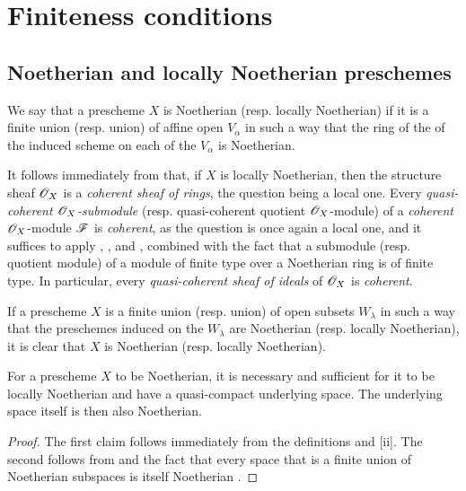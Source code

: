 \section{Finiteness conditions}
\label{section:I.6}

\subsection{Noetherian and locally Noetherian preschemes}
\label{subsection:I.6.1}

\begin{definition}[6.1.1]
\label{I.6.1.1}
We say that a prescheme $X$ is Noetherian (resp. locally Noetherian) if it is a finite union (resp. union) of affine open $V_\alpha$ in such a way that the ring of the of the induced scheme on each of the $V_\alpha$ is Noetherian.
\end{definition}

It follows immediately from  that, if $X$ is locally Noetherian, then the structure sheaf $\mathscr{O}_X$ is a \emph{coherent sheaf of rings}, the question being a local one.
Every \emph{quasi-coherent $\mathscr{O}_X$-submodule}
(resp. quasi-coherent quotient $\mathscr{O}_X$-module) of a \emph{coherent} $\mathscr{O}_X$-module $\mathscr{F}$ is \emph{coherent}, as the question is once again a local one, and it suffices to apply , , and , combined with the fact that a submodule (resp. quotient module) of a module of finite type over a Noetherian ring is of finite type.
In particular, every \emph{quasi-coherent sheaf of ideals} of $\mathscr{O}_X$ is \emph{coherent}.

If a prescheme $X$ is a finite union (resp. union) of open subsets $W_\lambda$ in such a way that the preschemes induced on the $W_\lambda$ are Noetherian (resp. locally Noetherian), it is clear that $X$ is Noetherian (resp. locally Noetherian).

\begin{proposition}[6.1.2]
\label{I.6.1.2}
For a prescheme $X$ to be Noetherian, it is necessary and sufficient for it to be locally Noetherian and have a quasi-compact underlying space.
The underlying space itself is then also Noetherian.
\end{proposition}

\begin{proof}
\label{proof-I.6.1.2}
The first claim follows immediately from the definitions and [ii].
The second follows from  and the fact that every space that is a finite union of Noetherian subspaces is itself Noetherian .
\end{proof}

